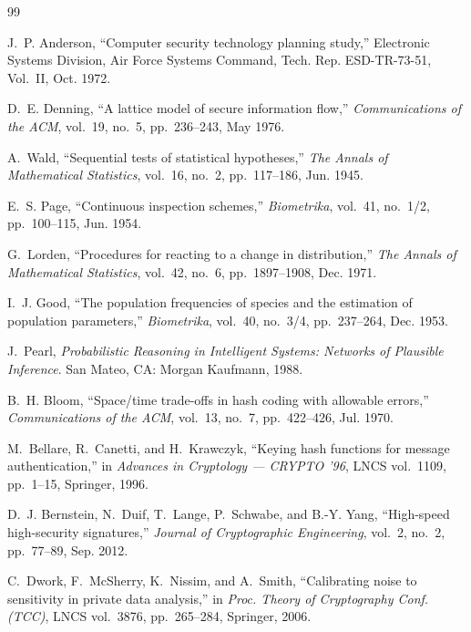 \documentclass[10pt,twocolumn,letterpaper]{article}
\makeatletter
\theoremstyle{plain}
\theoremstyle{definition}
\theoremstyle{remark}
\DeclareRobustCommand{\_}{\ifmmode\nfss@text{\textunderscore}\else\textunderscore\penalty\@highpenalty\hskip\z@skip\fi}
\makeatother
\begin{document}
\begin{thebibliography}{99}\small\raggedright

J.~P. Anderson, ``Computer security technology planning study,'' Electronic Systems Division, Air Force Systems Command, Tech. Rep. ESD-TR-73-51, Vol.~II, Oct. 1972.

D.~E. Denning, ``A lattice model of secure information flow,'' \emph{Communications of the ACM}, vol.~19, no.~5, pp.~236--243, May 1976.

A.~Wald, ``Sequential tests of statistical hypotheses,'' \emph{The Annals of Mathematical Statistics}, vol.~16, no.~2, pp.~117--186, Jun. 1945.

E.~S. Page, ``Continuous inspection schemes,'' \emph{Biometrika}, vol.~41, no.~1/2, pp.~100--115, Jun. 1954.

G.~Lorden, ``Procedures for reacting to a change in distribution,'' \emph{The Annals of Mathematical Statistics}, vol.~42, no.~6, pp.~1897--1908, Dec. 1971.

I.~J. Good, ``The population frequencies of species and the estimation of population parameters,'' \emph{Biometrika}, vol.~40, no.~3/4, pp.~237--264, Dec. 1953.

J.~Pearl, \emph{Probabilistic Reasoning in Intelligent Systems: Networks of Plausible Inference}. San Mateo, CA: Morgan Kaufmann, 1988.

B.~H. Bloom, ``Space/time trade-offs in hash coding with allowable errors,'' \emph{Communications of the ACM}, vol.~13, no.~7, pp.~422--426, Jul. 1970.

M.~Bellare, R.~Canetti, and H.~Krawczyk, ``Keying hash functions for message authentication,'' in \emph{Advances in Cryptology --- CRYPTO '96}, LNCS vol.~1109, pp.~1--15, Springer, 1996.

D.~J. Bernstein, N.~Duif, T.~Lange, P.~Schwabe, and B.-Y. Yang, ``High-speed high-security signatures,'' \emph{Journal of Cryptographic Engineering}, vol.~2, no.~2, pp.~77--89, Sep. 2012.

C.~Dwork, F.~McSherry, K.~Nissim, and A.~Smith, ``Calibrating noise to sensitivity in private data analysis,'' in \emph{Proc. Theory of Cryptography Conf. (TCC)}, LNCS vol.~3876, pp.~265--284, Springer, 2006.


\end{thebibliography}
\end{document}
